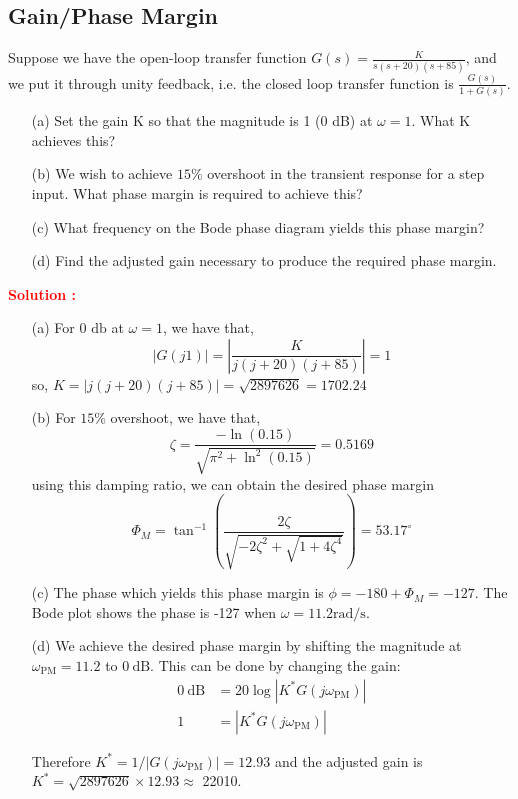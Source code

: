 \documentclass[12pt]{article}
\begin{document}
\clearpage
\subsection{Gain/Phase Margin}

Suppose we have the open-loop transfer function $G(s) = \frac{K}{s(s + 20)(s + 85)}$, and we put it through unity feedback, i.e. the closed loop transfer function is $\frac{G(s)}{
1 + G(s)}$.
\begin{enumerate}
    \item [(a)] Set the gain K so that the magnitude is 1 (0 dB) at $\omega=1$. What K achieves
this?
\item[(b)] We wish to achieve $15\%$ overshoot in the transient response for a step input. What phase
margin is required to achieve this?
\item[(c)] What frequency on the Bode phase diagram yields this phase margin?
\item[(d)] Find the adjusted gain necessary to produce the required phase margin.
\end{enumerate}

\textbf{\textcolor{red}{Solution :}} \\
\begin{enumerate}
    \item  [(a)] For 0 $\mathrm{db}$ at $\omega=1$, we have that,
$$ |G(j 1)|=\left|\frac{K}{j(j+20)(j+85)}\right|=1 $$
so,  $K=|j(j+20)(j+85)|=\sqrt{2897626}=1702.24$
\item  [(b)] For $15 \%$ overshoot, we have that,
$$ \zeta=\frac{-\ln (0.15)}{\sqrt{\pi^2+\ln ^2(0.15)}}=0.5169 $$
using this damping ratio, we can obtain the desired phase margin
$$ \Phi_M=\tan ^{-1}\left(\frac{2 \zeta}{\sqrt{-2 \zeta^2+\sqrt{1+4 \zeta^4}}}\right)=53.17^{\circ} $$

\item  [(c)] The phase which yields this phase margin is $\phi=-180+\Phi_M=-127$. The Bode plot shows the phase is -127 when $\omega=11.2 \mathrm{rad} / \mathrm{s}$. 
\item  [(d)] We achieve the desired phase margin by shifting the magnitude at $\omega_{\mathrm{PM}}=11.2$ to $0 \mathrm{~dB}$. This can be done by changing the gain:
$$
\begin{aligned}
0 \mathrm{~dB} & =20 \log \left|K^* G\left(j \omega_{\mathrm{PM}}\right)\right| \\
1 & =\left|K^* G\left(j \omega_{\mathrm{PM}}\right)\right|
\end{aligned}
$$

Therefore $K^*=1 /\left|G\left(j \omega_{\mathrm{PM}}\right)\right|=12.93$ and the adjusted gain is $K^*=\sqrt{2897626} \times 12.93 \approx$ 22010.
\end{enumerate}
\clearpage
\end{document}
